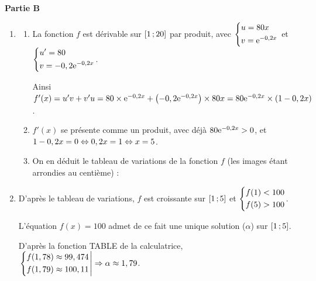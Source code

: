 \documentclass[a4paper,11pt]{article}
\begin{document}
\textbf{\large Partie B}
%
\begin{enumerate}
	\item
	\begin{enumerate}
		\item La fonction $f$ est dérivable sur $\mbox{\ensuremath{\left[1\mathpunct{};20\right]}}$ par produit, avec $\begin{dcases} u=80x \\ v={\rm e}^{-0,2x} \end{dcases}$ et $\begin{dcases} u'=80 \\ v=-0,2{\rm e}^{-0,2x} \end{dcases}$.
		
		Ainsi $f'(x)=u'v+v'u=80 \times {\rm e}^{-0,2x} + \left(-0,2{\rm e}^{-0,2x}\right) \times 80x = 80 {\rm e}^{-0,2x} \times (1-0,2x)$.
		\item $f'(x)$ se présente comme un produit, avec déjà $80{\rm e}^{-0,2x} > 0$, et $1-0,2x=0 \Leftrightarrow 0,2x=1 \Leftrightarrow x=5$.
		
		\begin{center}
		\end{center}
		\pagebreak
		\item On en déduit le tableau de variations de la fonction $f$ (les images étant arrondies au centième) :
		
		\begin{center}
		\end{center}
	\end{enumerate}
	\item D'après le tableau de variations, $f$ est croissante sur $\mbox{\ensuremath{\left[1\mathpunct{};5\right]}}$ et $\begin{dcases} f(1) < 100 \\ f(5) > 100 \end{dcases}$.
	
	L'équation $f(x)=100$ admet de ce fait une unique solution ($\alpha$) sur $\mbox{\ensuremath{\left[1\mathpunct{};5\right]}}$.
	
	D'après la fonction TABLE de la calculatrice, $\left. \begin{dcases} f(1,78) \approx 99,474 \\ f(1,79) \approx 100,11 \end{dcases} \right| \Rightarrow \alpha \approx 1,79$.
\end{enumerate}
\end{document}
